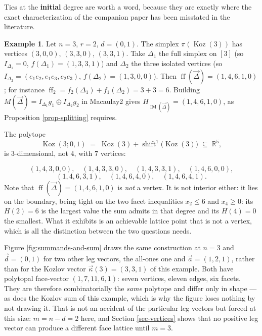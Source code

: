 \documentclass[11pt, a4paper, abstract=yes]{scrartcl}
\theoremstyle{definition}
\newtheorem{mexample}[definition]{Example}
\theoremstyle{remark}
\theoremstyle{plain}
\newcommand{\Koz}{\operatorname{Koz}}
\newcommand{\shift}{\operatorname{shift}}
\newcommand{\kozvec}{\vec\kappa}
\newcommand{\proj}{\pi}
\newcommand{\ff}{\operatorname{ff}}
\newcommand{\IM}{\operatorname{IM}}
\begin{document}
Ties at the \textbf{initial} degree are worth a word, because they are exactly where the exact
characterization of the companion paper has been misstated in the literature.

\begin{mexample}
Let \(n=3\), \(r=2\), \(d=(0,1)\). The simplex \(\proj(\Koz(3))\) has vertices \((3,0,0)\),
\((3,3,0)\), \((3,3,1)\).
Take \(\Delta_1\) the full simplex on \([3]\) (so \(I_{\Delta_1}=0\), \(f(\Delta_1)=(1,3,3,1)\)) and
\(\Delta_2\) the three isolated vertices (so \(I_{\Delta_2}=(e_1e_2,e_1e_3,e_2e_3)\),
\(f(\Delta_2)=(1,3,0,0)\)). Then \(\ff(\vec\Delta)=(1,4,6,1,0)\); for instance
\(\ff_2=f_2(\Delta_1)+f_1(\Delta_2)=3+3=6\). Building
\(M(\vec\Delta)=I_{\Delta_1}g_1\oplus I_{\Delta_2}g_2\) in Macaulay2 gives
\(H_{\IM(\vec\Delta)}=(1,4,6,1,0)\), as Proposition \ref{prop-splitting} requires.

The polytope
\begin{equation}\label{eq:worked}
  \Koz(3;0,1)\;=\;\Koz(3)+\shift^1\bigl(\Koz(3)\bigr)\;\subseteq\;\mathbb R^5 ,
\end{equation}
is \(3\)-dimensional, not \(4\),
with \(7\) vertices:

\begin{equation}\label{eq:worked-2}
  (1,4,3,0,0),\quad (1,4,3,3,0),\quad (1,4,3,3,1),\quad (1,4,6,0,0),
\end{equation}
\begin{equation}\label{eq:worked-3}
  (1,4,6,3,1),\quad (1,4,6,4,0),\quad (1,4,6,4,1).
\end{equation}
Note that \(\ff(\vec\Delta)=(1,4,6,1,0)\) is \emph{not} a vertex. It is not interior either: it lies on
the boundary, being tight on the two facet inequalities \(x_2\le6\) and \(x_4\ge0\): its
\(H(2)=6\) is the largest value the sum admits in that degree and its \(H(4)=0\) the smallest. What
it exhibits is an achievable lattice point that is not a vertex, which is all the distinction between
the two questions needs.

Figure \ref{fig:summands-and-sum} draws the same construction at \(n=3\) and \(\vec d=(0,1)\) for two
other leg vectors, the all-ones one and \(\vec a=(1,2,1)\), rather than for the Kozlov vector
\(\kozvec(3)=(3,3,1)\) of this example. Both have polytopal face-vector \((1,7,11,6,1)\): seven
vertices, eleven edges, six
facets. They are therefore combinatorially the \emph{same} polytope and differ only in shape --- as does
the Kozlov sum of this example, which is why the figure loses nothing by not drawing it. That is not
an accident of the particular leg vectors but forced at this size: \(m=n-d=2\) here, and
Section \ref{sec-vertices} shows that no positive leg vector can produce a different face lattice
until \(m=3\).
\label{ex-worked}
\end{mexample}
\end{document}
